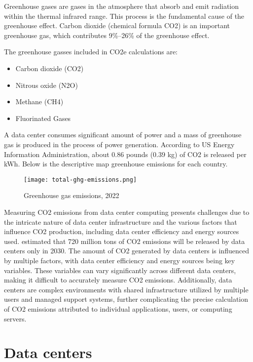 \documentclass[
  a4paper,  %
  twoside,  %
  bibliography=totoc,
  headsepline,
  cleardoublepage=empty,
  parskip=half,
  draft=false
]{scrbook}
\begin{document}
Greenhouse gases are gases in the atmosphere that absorb and emit radiation within the thermal infrared range. This process is the fundamental cause of the greenhouse effect. Carbon dioxide (chemical formula CO2) is an important greenhouse gas, which contributes 9\%–26\% of the greenhouse effect. 

The greenhouse gasses included in CO2e calculations are\cite{dioxide2017overview}:
\begin{itemize}
	\item Carbon dioxide (CO2)
	\item Nitrous oxide (N2O)
	\item Methane (CH4)
	\item Fluorinated Gases
\end{itemize}

A data center consumes significant amount of power and a mass of greenhouse gas is produced in the process of power generation. According to US Energy Information Administration\cite{US2023}, about 0.86 pounds (0.39 kg) of CO2 is released per kWh. Below is the descriptive map greenhouse emissions for each country. 

\begin{figure}
	\centering
	\texttt{[image: total-ghg-emissions.png]}
	\caption{Greenhouse gas emissions, 2022 \cite{owid-co2-and-greenhouse-gas-emissions}}
\end{figure}


Measuring CO2 emissions from data center computing presents challenges due to the intricate nature of data center infrastructure and the various factors that influence CO2 production, including data center efficiency and energy sources used\cite{wang2013review}. \cite{review_data_center_2021} estimated that 720 million tons of CO2 emissions will be released by data centers only in 2030. The amount of CO2 generated by data centers is influenced by multiple factors, with data center efficiency and energy sources being key variables. These variables can vary significantly across different data centers, making it difficult to accurately measure CO2 emissions. Additionally, data centers are complex environments with shared infrastructure utilized by multiple users and managed support systems, further complicating the precise calculation of CO2 emissions attributed to individual applications, users, or computing servers.

\section{Data centers}
\end{document}
